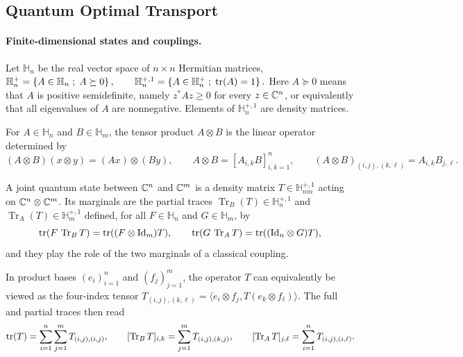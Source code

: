 \subsection{Quantum Optimal Transport}
\label{sec-quantum-ot}
\paragraph{Finite-dimensional states and couplings.}
\begin{defn}\label{def-hermitian-density-matrices}
Let $\mathbb H_n$ be the real vector space of $n\times n$ Hermitian matrices, \(\mathbb H_n^+ = \left\{ A\in\mathbb H_n \;;\; A\succeq0 \right\}, \qquad \mathbb H_n^{+,1} = \left\{ A\in\mathbb H_n^+ \;;\; \operatorname{tr}(A)=1 \right\}.\)
Here $A\succeq0$ means that $A$ is positive semidefinite, namely $z^*Az\geq0$ for every $z\in\mathbb{C}^n$, or equivalently that all eigenvalues of $A$ are nonnegative.
Elements of $\mathbb H_n^{+,1}$ are density matrices.
\end{defn}
For $A\in\mathbb H_n$ and $B\in\mathbb H_m$, the tensor product $A\otimes B$ is the linear operator determined by
\begin{equation}\label{eq-qot-tensor-product}
(A\otimes B)(x\otimes y)=(Ax)\otimes(By),
\qquad
A\otimes B=[A_{i,k}B]_{i,k=1}^n,
\qquad
(A\otimes B)_{(i,j),(k,\ell)}=A_{i,k}B_{j,\ell}.
\end{equation}
\begin{defn}\label{def-joint-quantum-state}
A joint quantum state between $\mathbb{C}^n$ and $\mathbb{C}^m$ is a density matrix $T\in\mathbb H_{nm}^{+,1}$ acting on $\mathbb{C}^n\otimes\mathbb{C}^m$. Its marginals are the partial traces $\operatorname{Tr}_B(T)\in\mathbb H_n^{+,1}$ and $\operatorname{Tr}_A(T)\in\mathbb H_m^{+,1}$ defined, for all $F\in\mathbb H_n$ and $G\in\mathbb H_m$, by
\begin{equation}\label{eq-qot-partial-traces}
\operatorname{tr}(F\,\operatorname{Tr}_B T)=\operatorname{tr}((F\otimes\mathrm{Id}_m)T),
\qquad
\operatorname{tr}(G\,\operatorname{Tr}_A T)=\operatorname{tr}((\mathrm{Id}_n\otimes G)T),
\end{equation}
and they play the role of the two marginals of a classical coupling.
\end{defn}
In product bases $(e_i)_{i=1}^n$ and $(f_j)_{j=1}^m$, the operator $T$ can equivalently be viewed as the four-index tensor
\(T_{(i,j),(k,\ell)} = \langle e_i\otimes f_j,T(e_k\otimes f_\ell)\rangle.\)
The full and partial traces then read
\begin{equation}\label{eq-qot-partial-traces-indices}
\operatorname{tr}(T)=\sum_{i=1}^n\sum_{j=1}^m T_{(i,j),(i,j)},
\qquad
[\operatorname{Tr}_B T]_{i,k}=\sum_{j=1}^m T_{(i,j),(k,j)},
\qquad
[\operatorname{Tr}_A T]_{j,\ell}=\sum_{i=1}^n T_{(i,j),(i,\ell)}.
\end{equation}
